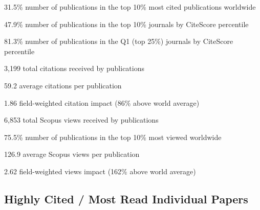 \documentclass[11pt,a4paper]{report} %
\begin{document}
    \begin{tablist}
    
        \item[31.5\%] \tab{}number of publications in the top 10\% most cited publications worldwide  
        
        \item[47.9\%] \tab{}number of publications in the top 10\% journals by CiteScore percentile  

        \item[81.3\%] \tab{}number of publications in the Q1 (top 25\%) journals by CiteScore percentile  
        
        \item[3,199] \tab{}total citations received by publications  
        
        \item[59.2] \tab{}average citations per publication  
        
        \item[1.86] \tab{}field-weighted citation impact (86\% above world average)  
        
        \item[6,853] \tab{}total Scopus views received by publications  
        
        \item[75.5\%] \tab{}number of publications in the top 10\% most viewed worldwide  
        
        \item[126.9] \tab{}average Scopus views per publication  
        
        \item[2.62] \tab{}field-weighted views impact (162\% above world average)  
        
    \end{tablist} 

    \subsection*{Highly Cited / Most Read Individual Papers}
    
\end{document}
